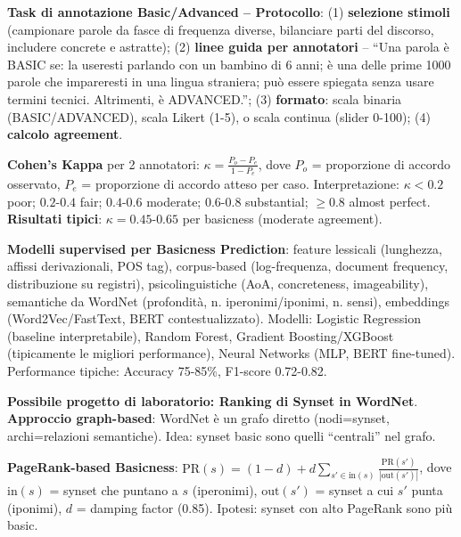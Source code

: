 \documentclass[12pt,a4paper]{article}
\begin{document}
\textbf{Task di annotazione Basic/Advanced -- Protocollo}: (1) \textbf{selezione stimoli} (campionare parole da fasce di frequenza diverse, bilanciare parti del discorso, includere concrete e astratte); (2) \textbf{linee guida per annotatori} -- ``Una parola \`e BASIC se: la useresti parlando con un bambino di 6 anni; \`e una delle prime 1000 parole che impareresti in una lingua straniera; pu\`o essere spiegata senza usare termini tecnici. Altrimenti, \`e ADVANCED.''; (3) \textbf{formato}: scala binaria (BASIC/ADVANCED), scala Likert (1-5), o scala continua (slider 0-100); (4) \textbf{calcolo agreement}.

\begin{formulabox}
\textbf{Cohen's Kappa} per 2 annotatori: $\kappa = \frac{P_o - P_e}{1 - P_e}$, dove $P_o$ = proporzione di accordo osservato, $P_e$ = proporzione di accordo atteso per caso. Interpretazione: $\kappa<0.2$ poor; $0.2$-$0.4$ fair; $0.4$-$0.6$ moderate; $0.6$-$0.8$ substantial; $\geq 0.8$ almost perfect. \textbf{Risultati tipici}: $\kappa = 0.45$-$0.65$ per basicness (moderate agreement).
\end{formulabox}

\textbf{Modelli supervised per Basicness Prediction}: feature lessicali (lunghezza, affissi derivazionali, POS tag), corpus-based (log-frequenza, document frequency, distribuzione su registri), psicolinguistiche (AoA, concreteness, imageability), semantiche da WordNet (profondit\`a, n. iperonimi/iponimi, n. sensi), embeddings (Word2Vec/FastText, BERT contestualizzato). Modelli: Logistic Regression (baseline interpretabile), Random Forest, Gradient Boosting/XGBoost (tipicamente le migliori performance), Neural Networks (MLP, BERT fine-tuned). Performance tipiche: Accuracy 75-85\%, F1-score 0.72-0.82.

\textbf{Possibile progetto di laboratorio: Ranking di Synset in WordNet}. \textbf{Approccio graph-based}: WordNet \`e un grafo diretto (nodi=synset, archi=relazioni semantiche). Idea: synset basic sono quelli ``centrali'' nel grafo.

\begin{formulabox}
\textbf{PageRank-based Basicness}: $\text{PR}(s) = (1-d) + d\sum_{s' \in \text{in}(s)} \frac{\text{PR}(s')}{|\text{out}(s')|}$, dove $\text{in}(s)$ = synset che puntano a $s$ (iperonimi), $\text{out}(s')$ = synset a cui $s'$ punta (iponimi), $d$ = damping factor (0.85). Ipotesi: synset con alto PageRank sono pi\`u basic.
\end{formulabox}
\end{document}

